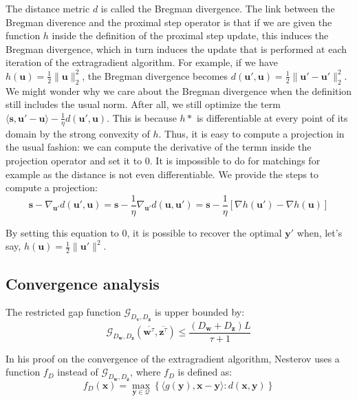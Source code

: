 \documentclass{article}
\renewcommand{\vec}{\mathbf}
\begin{document}
The distance metric $d$ is called the Bregman divergence. The link between the Bregman diverence and the proximal step operator is that if we are given the function $h$ inside the definition of the proximal step update, this induces the Bregman divergence, which in turn induces the update that is performed at each iteration of the extragradient algorithm. For example, if we have $h(\vec u) = \frac{1}{2} \lVert \vec u \rVert_2^2 $, the Bregman divergence becomes $d(\vec u', \vec u) = \frac{1}{2} \lVert \vec u' - \vec u' \rVert_2^2$. We might wonder why we care about the Bregman divergence when the definition still includes the usual norm. After all, we still optimize the term $\langle \vec s, \vec u' - \vec u \rangle - \frac{1}{\eta} d(\vec u', \vec  u)$. This is because $h*$ is differentiable at every point of its domain by the strong convexity of $h$. Thus, it is easy to compute a projection in the usual fashion: we can compute the derivative of the termn inside the projection operator and set it to 0. It is impossible to do for matchings for example as the distance is not even differentiable. We provide the steps to compute a projection: 
\begin{equation}
  \vec s - \nabla_{\vec u'} d(\vec u', \vec u) = \vec s - \frac{1}{\eta} \nabla_{\vec u'} d(\vec u, \vec u') = \vec s - \frac{1}{\eta} \left [\nabla h(\vec u') - \nabla h(\vec u) \right]
\end{equation}

By setting this equation to 0, it is possible to recover the optimal $\vec y'$ when, let's say, $h(\vec u) = \frac{1}{2} \lVert \vec u' \rVert^2$. 

\subsection{Convergence analysis} The restricted gap function
$\mathcal{G}_{D_{\vec v}, D_{\vec z}}$ is upper bounded by:
\begin{equation} \mathcal{G}_{D_{\vec w}, D_{\vec z}}(\overline{\vec w^{\tau}},
\overline{\vec z^{\tau}}) \leq \frac{\left( D_{\vec w} + D_{\vec z} \right)
L}{\tau + 1}
\label{eq:ub}
\end{equation}

In his proof on the convergence of the extragradient algorithm, Nesterov uses a
function $f_D$ instead of $\mathcal{G}_{D_{\vec w}, D_{\vec z}}$, where $f_D$ is
defined as:
\begin{equation}
f_D(\vec x) = \max_{\vec y \in \mathcal{Q}} \left \{ \langle g(\vec y), \vec x -
\vec y \rangle : d(\vec x, \vec y) \right \}
\end{equation}
\end{document}

